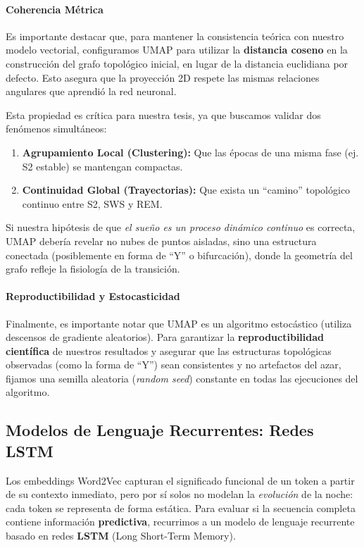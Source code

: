 \paragraph*{Coherencia Métrica}
Es importante destacar que, para mantener la consistencia teórica con nuestro modelo vectorial, configuramos UMAP para utilizar la \textbf{distancia coseno} en la construcción del grafo topológico inicial, en lugar de la distancia euclidiana por defecto. Esto asegura que la proyección 2D respete las mismas relaciones angulares que aprendió la red neuronal.

Esta propiedad es crítica para nuestra tesis, ya que buscamos validar dos fenómenos simultáneos:
\begin{enumerate}
    \item \textbf{Agrupamiento Local (Clustering):} Que las épocas de una misma fase (ej. S2 estable) se mantengan compactas.
    \item \textbf{Continuidad Global (Trayectorias):} Que exista un ``camino'' topológico continuo entre S2, SWS y REM.
\end{enumerate}

Si nuestra hipótesis de que \textit{el sueño es un proceso dinámico continuo} es correcta, UMAP debería revelar no nubes de puntos aisladas, sino una estructura conectada (posiblemente en forma de ``Y'' o bifurcación), donde la geometría del grafo refleje la fisiología de la transición.

\paragraph*{Reproductibilidad y Estocasticidad}
Finalmente, es importante notar que UMAP es un algoritmo estocástico (utiliza descensos de gradiente aleatorios). Para garantizar la \textbf{reproductibilidad científica} de nuestros resultados y asegurar que las estructuras topológicas observadas (como la forma de ``Y'') sean consistentes y no artefactos del azar, fijamos una semilla aleatoria (\textit{random seed}) constante en todas las ejecuciones del algoritmo.

\subsection{Modelos de Lenguaje Recurrentes: Redes LSTM}

Los embeddings Word2Vec capturan el significado funcional de un token a partir de su contexto inmediato, pero por sí solos no modelan la \textit{evolución} de la noche: cada token se representa de forma estática. Para evaluar si la secuencia completa contiene información \textbf{predictiva}, recurrimos a un modelo de lenguaje recurrente basado en redes \textbf{LSTM} (Long Short-Term Memory).

